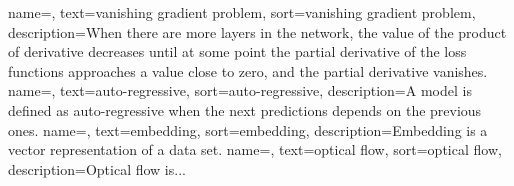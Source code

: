 {
    name=,
    text=vanishing gradient problem,
    sort=vanishing gradient problem,
    description={When there are more layers in the network, the value of the product of derivative decreases until at some point the partial derivative of the loss functions approaches a value close to zero, and the partial derivative vanishes.}
}
{
    name=,
    text=auto-regressive,
    sort=auto-regressive,
    description={A model is defined as auto-regressive when the next predictions depends on the previous ones.} %
}
{
    name=,
    text=embedding,
    sort=embedding,
    description={Embedding is a vector representation of a data set.}
}
{
    name=,
    text=optical flow,
    sort=optical flow,
    description={Optical flow is...}
}

